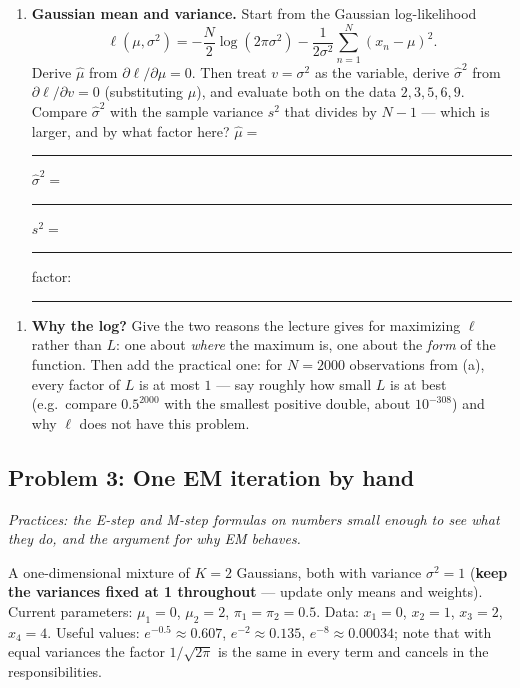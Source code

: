\documentclass[
  11pt,
]{article}
\providecommand{\tightlist}{%
  \setlength{\itemsep}{0pt}\setlength{\parskip}{0pt}}
\newcommand{\answerspace}[1]{\par\vspace*{#1}}  %
\newcommand{\blank}[1][1.2in]{\rule{#1}{0.4pt}}
\newcommand{\answerpage}{\clearpage}
\begin{document}
\answerspace{3in}

\begin{enumerate}
\def\labelenumi{(\alph{enumi})}
\setcounter{enumi}{1}
\tightlist
\item
  \textbf{Gaussian mean and variance.} Start from the Gaussian
  log-likelihood
  \[\ell(\mu,\sigma^2) = -\frac N2\log(2\pi\sigma^2) - \frac{1}{2\sigma^2}\sum_{n=1}^N (x_n-\mu)^2 .\]
  Derive \(\hat\mu\) from \(\partial\ell/\partial\mu = 0\). Then treat
  \(v = \sigma^2\) as the variable, derive \(\hat\sigma^2\) from
  \(\partial\ell/\partial v = 0\) (substituting \(\hat\mu\)), and
  evaluate both on the data \(2, 3, 5, 6, 9\). Compare \(\hat\sigma^2\)
  with the sample variance \(s^2\) that divides by \(N-1\) --- which is
  larger, and by what factor here? \(\hat\mu =\)
  \blank[0.6in]\quad \(\hat\sigma^2 =\) \blank[0.6in]\quad \(s^2 =\)
  \blank[0.6in]\quad factor: \blank[0.6in]
\end{enumerate}

\answerspace{3in}

\begin{enumerate}
\def\labelenumi{(\alph{enumi})}
\setcounter{enumi}{2}
\tightlist
\item
  \textbf{Why the log?} Give the two reasons the lecture gives for
  maximizing \(\ell\) rather than \(L\): one about \emph{where} the
  maximum is, one about the \emph{form} of the function. Then add the
  practical one: for \(N = 2000\) observations from (a), every factor of
  \(L\) is at most \(1\) --- say roughly how small \(L\) is at best
  (e.g.~compare \(0.5^{2000}\) with the smallest positive double, about
  \(10^{-308}\)) and why \(\ell\) does not have this problem.
\end{enumerate}

\answerspace{2.2in}

\answerpage

\subsection{Problem 3: One EM iteration by
hand}\label{problem-3-one-em-iteration-by-hand}

\emph{Practices: the E-step and M-step formulas on numbers small enough
to see what they do, and the argument for why EM behaves.}

A one-dimensional mixture of \(K=2\) Gaussians, both with variance
\(\sigma^2 = 1\) (\textbf{keep the variances fixed at 1 throughout} ---
update only means and weights). Current parameters: \(\mu_1 = 0\),
\(\mu_2 = 2\), \(\pi_1 = \pi_2 = 0.5\). Data: \(x_1 = 0\), \(x_2 = 1\),
\(x_3 = 2\), \(x_4 = 4\). Useful values: \(e^{-0.5}\approx0.607\),
\(e^{-2}\approx0.135\), \(e^{-8}\approx0.00034\); note that with equal
variances the factor \(1/\sqrt{2\pi}\) is the same in every term and
cancels in the responsibilities.
\end{document}

